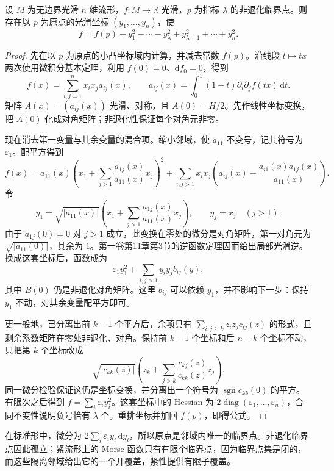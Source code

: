 \begin{theorem}[Morse 引理]\label{g2:thm:morse-lemma}
	设 \(M\) 为无边界光滑 \(n\) 维流形，\(f:M\to\mathbb R\) 光滑，\(p\) 为指标 \(\lambda\) 的非退化临界点。则存在以 \(p\) 为原点的光滑坐标 \((y_1,\ldots,y_n)\)，使
	\begin{equation}\label{g2:eq:morse-normal-form}
		f=f(p)-y_1^2-\cdots-y_\lambda^2+y_{\lambda+1}^2+\cdots+y_n^2.
	\end{equation}
\end{theorem}
\begin{proof}
	先在以 \(p\) 为原点的小凸坐标域内计算，并减去常数 \(f(p)\)。沿线段 \(t\mapsto tx\) 两次使用微积分基本定理，利用 \(f(0)=0\)、\(\mathrm df_0=0\)，得到
	\[
		f(x)=\sum_{i,j=1}^n x_ix_j a_{ij}(x),\qquad
		a_{ij}(x)=\int_0^1(1-t)\partial_i\partial_jf(tx)\,\mathrm dt.
	\]
	矩阵 \(A(x)=(a_{ij}(x))\) 光滑、对称，且 \(A(0)=H/2\)。先作线性坐标变换，把 \(A(0)\) 化成对角矩阵；非退化性保证每个对角元非零。

	现在消去第一变量与其余变量的混合项。缩小邻域，使 \(a_{11}\) 不变号，记其符号为 \(\varepsilon_1\)。配平方得到
	\[
		f(x)=a_{11}(x)\left(x_1+\sum_{j>1}\frac{a_{1j}(x)}{a_{11}(x)}x_j\right)^2
		+\sum_{i,j>1}x_ix_j\left(a_{ij}(x)-\frac{a_{i1}(x)a_{1j}(x)}{a_{11}(x)}\right).
	\]
	令
	\[
		y_1=\sqrt{|a_{11}(x)|}\left(x_1+\sum_{j>1}\frac{a_{1j}(x)}{a_{11}(x)}x_j\right),
		\qquad y_j=x_j\quad(j>1).
	\]
	由于 \(a_{1j}(0)=0\) 对 \(j>1\) 成立，此变换在零处的微分是对角矩阵，第一对角元为 \(\sqrt{|a_{11}(0)|}\)，其余为 \(1\)。第一卷第11章第3节的逆函数定理因而给出局部光滑逆。换成这套坐标后，函数成为
	\[
		\varepsilon_1y_1^2+\sum_{i,j>1}y_iy_j b_{ij}(y),
	\]
	其中 \(B(0)\) 仍是非退化对角矩阵。这里 \(b_{ij}\) 可以依赖 \(y_1\)，并不影响下一步：保持 \(y_1\) 不动，对其余变量配平方即可。

	更一般地，已分离出前 \(k-1\) 个平方后，余项具有 \(\sum_{i,j\ge k}z_iz_j c_{ij}(z)\) 的形式，且剩余系数矩阵在零处非退化、对角。保持前 \(k-1\) 个坐标和后 \(n-k\) 个坐标不动，只把第 \(k\) 个坐标改成
	\[
		\sqrt{|c_{kk}(z)|}\left(z_k+\sum_{j>k}\frac{c_{kj}(z)}{c_{kk}(z)}z_j\right).
	\]
	同一微分检验保证这仍是坐标变换，并分离出一个符号为 \(\operatorname{sgn}c_{kk}(0)\) 的平方。有限次之后得到 \(f=\sum_i\varepsilon_i y_i^2\)。这套坐标中的 Hessian 为 \(2\operatorname{diag}(\varepsilon_1,\ldots,\varepsilon_n)\)，合同不变性说明负号恰有 \(\lambda\) 个。重排坐标并加回 \(f(p)\)，即得公式。
\end{proof}

在标准形中，微分为 \(2\sum_i\varepsilon_i y_i\,\mathrm dy_i\)，所以原点是邻域内唯一的临界点。非退化临界点因此孤立；紧流形上的 Morse 函数只有有限个临界点，因为临界点集是闭的，而这些隔离邻域给出它的一个开覆盖，紧性提供有限子覆盖。

